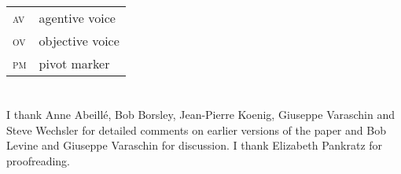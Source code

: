 \documentclass[output=paper,biblatex,babelshorthands,newtxmath,draftmode,colorlinks,citecolor=brown]{langscibook}
\begin{document}
\begin{tabularx}{.99\textwidth}{@{}lX}
\textsc{av} & agentive voice\\
\textsc{ov} & objective voice\\
\textsc{pm} & pivot marker\\
\end{tabularx}




\section*{\acknowledgmentsUS}


I thank Anne Abeillé, Bob Borsley, Jean-Pierre Koenig, Giuseppe Varaschin and Steve Wechsler for detailed comments on earlier versions
of the paper and Bob Levine and Giuseppe Varaschin for discussion.
I thank Elizabeth Pankratz for proofreading.








{\sloppy
\printbibliography[heading=subbibliography,notkeyword=this]
}
\end{document}
